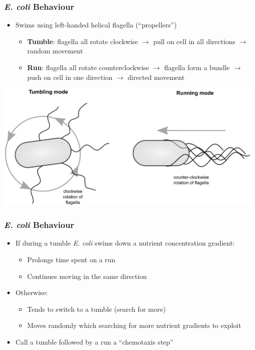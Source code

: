 \documentclass{beamer}
\begin{document}
\begin{frame}
\frametitle{\textit{\textit{E. coli}} Behaviour}
\begin{itemize}
  \item Swims using left-handed helical flagella (``propellers'')
  \begin{itemize}
    \item \textbf{Tumble}: flagella all rotate clockwise $\to$ pull on cell in all directions $\to$ random movement
    \item \textbf{Run}: flagella all rotate counterclockwise $\to$ flagella form a bundle $\to$ push on cell in one direction $\to$ directed movement
  \end{itemize}
\end{itemize}
\begin{center}
\includegraphics[scale=0.2]{assets/ecoli}
\end{center}
\end{frame}

\begin{frame}
\frametitle{\textit{\textit{E. coli}} Behaviour}
\begin{itemize}
  \item If during a tumble \textit{\textit{E. coli}} swims down a nutrient concentration gradient:
  \begin{itemize}
    \item Prolongs time spent on a run
    \item Continues moving in the same direction
  \end{itemize}
  \item Otherwise:
  \begin{itemize}
    \item Tends to switch to a tumble (search for more)
    \item Moves randomly which searching for more nutrient gradients to exploit
  \end{itemize}
  \item Call a tumble followed by a run a ``chemotaxis step''
\end{itemize}
\end{frame}
\end{document}
